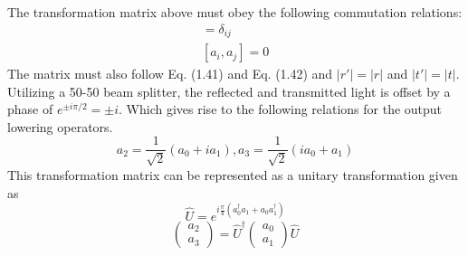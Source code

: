 The transformation matrix above must obey the following commutation relations: 
\begin{eqnarray}
[a_{i}, a_{j}^{\dagger}] = \delta_{ij} \\ {[a_{i}, a_{j}]} = 0 
\end{eqnarray}
The matrix must also follow Eq. (1.41) and Eq. (1.42) and $|r'| = |r|$ and $|t'| = |t|$. \newline
Utilizing a 50-50 beam splitter, the reflected and transmitted light is offset by a phase of $e^{\pm i \pi / 2} = \pm i$. Which gives rise to the following relations for the output lowering operators.
\begin{equation}
    a_2 = \frac{1}{\sqrt{2}} (a_0 + ia_1), a_3 = \frac{1}{\sqrt{2}}(ia_0 + a_1)
\end{equation}
This transformation matrix can be represented as a unitary transformation given as
\begin{equation}
    \hat{U} = e^{i\frac{\pi}{4}(a_{0}^{\dagger}a_1 + a_{0}a_{1}^{\dagger})}
\end{equation}
\begin{equation}
    \begin{pmatrix} a_{2} \\ a_{3} \end{pmatrix} = \hat{U}^{\dagger} \begin{pmatrix} a_{0} \\ a_{1} \end{pmatrix} \hat{U}
\end{equation} \newline
